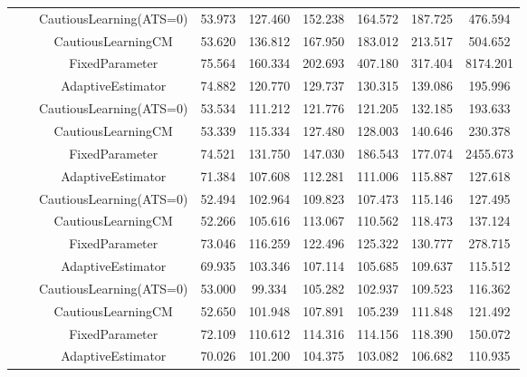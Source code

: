 \begin{table}[!h]
\begin{tabular}[t]{ccccccccc}
 &  & CautiousLearning(ATS=0) & 53.973 & 127.460 & 152.238 & 164.572 & 187.725 & 476.594\\

 &  & CautiousLearningCM & 53.620 & 136.812 & 167.950 & 183.012 & 213.517 & 504.652\\

 & \multirow[t]{-4}{*}{\centering\arraybackslash 0.35} & FixedParameter & 75.564 & 160.334 & 202.693 & 407.180 & 317.404 & 8174.201\\
\cmidrule{2-9}
 &  & AdaptiveEstimator & 74.882 & 120.770 & 129.737 & 130.315 & 139.086 & 195.996\\

 &  & CautiousLearning(ATS=0) & 53.534 & 111.212 & 121.776 & 121.205 & 132.185 & 193.633\\

 &  & CautiousLearningCM & 53.339 & 115.334 & 127.480 & 128.003 & 140.646 & 230.378\\

 & \multirow[t]{-4}{*}{\centering\arraybackslash 0.50} & FixedParameter & 74.521 & 131.750 & 147.030 & 186.543 & 177.074 & 2455.673\\
\cmidrule{2-9}
 &  & AdaptiveEstimator & 71.384 & 107.608 & 112.281 & 111.006 & 115.887 & 127.618\\

 &  & CautiousLearning(ATS=0) & 52.494 & 102.964 & 109.823 & 107.473 & 115.146 & 127.495\\

 &  & CautiousLearningCM & 52.266 & 105.616 & 113.067 & 110.562 & 118.473 & 137.124\\

 & \multirow[t]{-4}{*}{\centering\arraybackslash 0.75} & FixedParameter & 73.046 & 116.259 & 122.496 & 125.322 & 130.777 & 278.715\\
\cmidrule{2-9}
 &  & AdaptiveEstimator & 69.935 & 103.346 & 107.114 & 105.685 & 109.637 & 115.512\\

 &  & CautiousLearning(ATS=0) & 53.000 & 99.334 & 105.282 & 102.937 & 109.523 & 116.362\\

 &  & CautiousLearningCM & 52.650 & 101.948 & 107.891 & 105.239 & 111.848 & 121.492\\

 & \multirow[t]{-4}{*}{\centering\arraybackslash 1.00} & FixedParameter & 72.109 & 110.612 & 114.316 & 114.156 & 118.390 & 150.072\\
\cmidrule{2-9}
 &  & AdaptiveEstimator & 70.026 & 101.200 & 104.375 & 103.082 & 106.682 & 110.935\\


\end{tabular}
\end{table}
